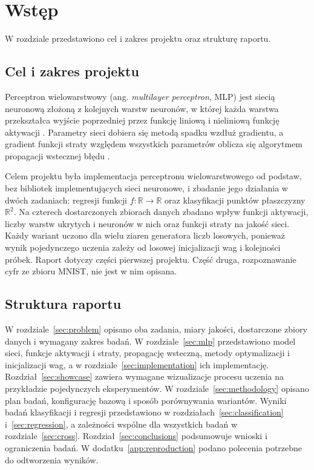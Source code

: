 \section{Wstęp}
\label{sec:introduction}

W rozdziale przedstawiono cel i zakres projektu oraz strukturę raportu.

\subsection{Cel i zakres projektu}
\label{sec:introduction-goal}

Perceptron wielowarstwowy (ang. \textit{multilayer perceptron}, MLP) jest siecią neuronową złożoną z kolejnych warstw neuronów, w której każda warstwa przekształca wyjście poprzedniej przez funkcję liniową i nieliniową funkcję aktywacji \cite{goodfellow2016}. Parametry sieci dobiera się metodą spadku wzdłuż gradientu, a gradient funkcji straty względem wszystkich parametrów oblicza się algorytmem propagacji wstecznej błędu \cite{rumelhart1986}.

Celem projektu była implementacja perceptronu wielowarstwowego od podstaw, bez bibliotek implementujących sieci neuronowe, i zbadanie jego działania w dwóch zadaniach: regresji funkcji $f \colon \mathbb{R} \to \mathbb{R}$ oraz klasyfikacji punktów płaszczyzny $\mathbb{R}^2$. Na czterech dostarczonych zbiorach danych zbadano wpływ funkcji aktywacji, liczby warstw ukrytych i neuronów w nich oraz funkcji straty na jakość sieci. Każdy wariant uczono dla wielu ziaren generatora liczb losowych, ponieważ wynik pojedynczego uczenia zależy od losowej inicjalizacji wag i kolejności próbek. Raport dotyczy części pierwszej projektu. Część druga, rozpoznawanie cyfr ze zbioru MNIST, nie jest w nim opisana.

\subsection{Struktura raportu}
\label{sec:introduction-outline}

W rozdziale~\ref{sec:problem} opisano oba zadania, miary jakości, dostarczone zbiory danych i wymagany zakres badań. W rozdziale~\ref{sec:mlp} przedstawiono model sieci, funkcje aktywacji i straty, propagację wsteczną, metody optymalizacji i inicjalizacji wag, a w rozdziale~\ref{sec:implementation} ich implementację. Rozdział~\ref{sec:showcase} zawiera wymagane wizualizacje procesu uczenia na przykładzie pojedynczych eksperymentów. W rozdziale~\ref{sec:methodology} opisano plan badań, konfigurację bazową i sposób porównywania wariantów. Wyniki badań klasyfikacji i regresji przedstawiono w rozdziałach~\ref{sec:classification} i~\ref{sec:regression}, a zależności wspólne dla wszystkich badań w rozdziale~\ref{sec:cross}. Rozdział~\ref{sec:conclusions} podsumowuje wnioski i ograniczenia badań. W dodatku~\ref{app:reproduction} podano polecenia potrzebne do odtworzenia wyników.
